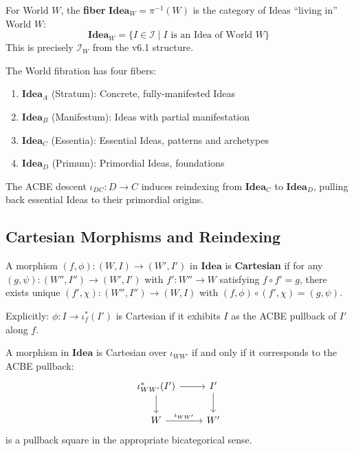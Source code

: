 \begin{definition}
\label{def:fiber-over-world}
For World $W$, the \textbf{fiber} $\mathbf{Idea}_W = \pi^{-1}(W)$ is the
category of Ideas ``living in'' World $W$:
\[
  \mathbf{Idea}_W = \{I \in \mathcal{I} \mid I \text{ is an Idea of World } W\}
\]
This is precisely $\mathcal{I}_W$ from the v6.1 structure.
\end{definition}

\begin{example}
\label{ex:four-fibers}
The World fibration has four fibers:
\begin{enumerate}
  \item $\mathbf{Idea}_A$ (Stratum): Concrete, fully-manifested Ideas
  \item $\mathbf{Idea}_B$ (Manifestum): Ideas with partial manifestation
  \item $\mathbf{Idea}_C$ (Essentia): Essential Ideas, patterns and archetypes
  \item $\mathbf{Idea}_D$ (Primum): Primordial Ideas, foundations
\end{enumerate}
The ACBE descent $\iota_{DC} : D \to C$ induces reindexing from
$\mathbf{Idea}_C$ to $\mathbf{Idea}_D$, pulling back essential Ideas
to their primordial origins.
\end{example}

\subsection{Cartesian Morphisms and Reindexing}
\label{subsec:cartesian-reindexing}

\begin{definition}
\label{def:cartesian-world-fibration}
A morphism $(f, \phi) : (W, I) \to (W', I')$ in $\mathbf{Idea}$ is
\textbf{Cartesian} if for any $(g, \psi) : (W'', I'') \to (W', I')$ with
$f' : W'' \to W$ satisfying $f \circ f' = g$, there exists unique
$(f', \chi) : (W'', I'') \to (W, I)$ with $(f, \phi) \circ (f', \chi) = (g, \psi)$.

Explicitly: $\phi : I \to \iota_f^*(I')$ is Cartesian if it exhibits $I$
as the ACBE pullback of $I'$ along $f$.
\end{definition}

\begin{proposition}[Cartesian = ACBE Pullback]
\label{prop:cartesian-acbe-pullback}
A morphism in $\mathbf{Idea}$ is Cartesian over $\iota_{WW'}$ if and only if
it corresponds to the ACBE pullback:
\[
\begin{tikzcd}
  \iota_{WW'}^*(I') \arrow[r] \arrow[d] & I' \arrow[d] \\
  W \arrow[r, "\iota_{WW'}"] & W'
\end{tikzcd}
\]
is a pullback square in the appropriate bicategorical sense.
\end{proposition}

